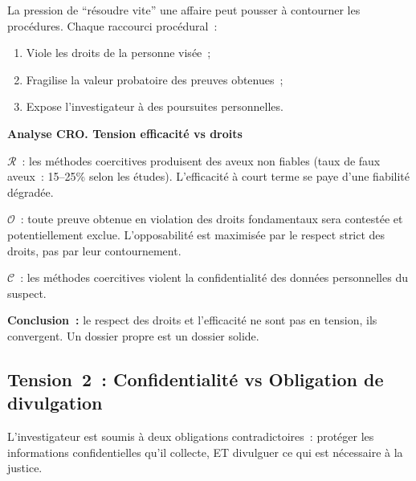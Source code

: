 La pression de ``résoudre vite'' une affaire peut pousser à contourner
les procédures. Chaque raccourci procédural~:
\begin{enumerate}
    \item Viole les droits de la personne visée~;
    \item Fragilise la valeur probatoire des preuves obtenues~;
    \item Expose l'investigateur à des poursuites personnelles.
\end{enumerate}

\begin{boxCRO}
\textbf{Analyse CRO. Tension efficacité vs droits}

$\mathcal{R}$~: les méthodes coercitives produisent des aveux non fiables
(taux de faux aveux~: 15--25\% selon les études). L'efficacité à court
terme se paye d'une fiabilité dégradée.

$\mathcal{O}$~: toute preuve obtenue en violation des droits fondamentaux
sera contestée et potentiellement exclue. L'opposabilité est maximisée
par le respect strict des droits, pas par leur contournement.

$\mathcal{C}$~: les méthodes coercitives violent la confidentialité
des données personnelles du suspect.


\textbf{Conclusion~:} le respect des droits et l'efficacité ne sont
pas en tension, ils convergent. Un dossier propre est un dossier solide.
\end{boxCRO}

\subsection{Tension~2~: Confidentialité vs Obligation de divulgation}

L'investigateur est soumis à deux obligations contradictoires~:
protéger les informations confidentielles qu'il collecte, ET divulguer
ce qui est nécessaire à la justice.

